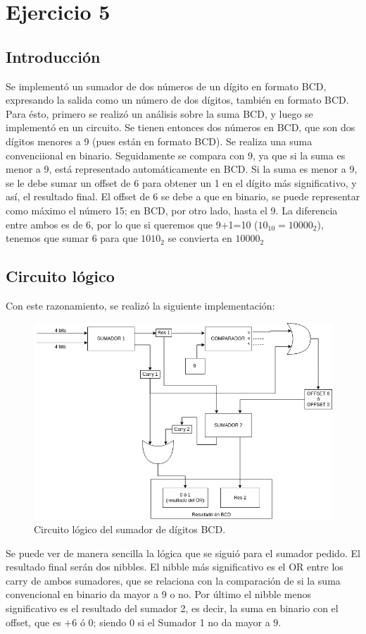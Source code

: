 \section{Ejercicio 5}
\subsection{Introducción}

Se implementó un sumador de dos números de un dígito en formato BCD, expresando la salida como un número de dos dígitos, también en formato BCD.
Para ésto, primero se realizó un análisis sobre la suma BCD, y luego se implementó en un circuito.
Se tienen entonces dos números en BCD, que son dos dígitos menores a 9 (pues están en formato BCD). Se realiza una suma convenciional en binario. Seguidamente se compara con 9, ya que si la suma es menor a 9, está representado automáticamente en BCD.
Si la suma es menor a 9, se le debe sumar un offset de 6 para obtener un 1 en el dígito más significativo, y así, el resultado final. 
El offset de 6 se debe a que en binario, se puede representar como máximo el número 15; en BCD, por otro lado, hasta el 9.
La diferencia entre ambos es de 6, por lo que si queremos que 9+1=10 ($10_{10}=1 0000_{2}$), tenemos que sumar 6
para que $1010_2$ se convierta en  $1 0000_{2}$
\subsection{Circuito lógico}
Con este razonamiento, se realizó la siguiente implementación:
\begin{figure}[H]
    \begin{center}
        \caption{Circuito lógico del sumador de dígitos BCD.}
\includegraphics[scale=0.5]{circuito.png}
    \end{center}
\end{figure}

Se puede ver de manera sencilla la lógica que se siguió para el sumador pedido. El resultado final serán dos nibbles. El nibble más significativo es el OR entre los carry de ambos sumadores, que se relaciona con la comparación de si la suma convencional 
en binario da mayor a 9 o no. Por último el nibble menos significativo es el resultado del sumador 2, es decir, la suma en binario con el offset, que es $+6$ ó $0$; siendo $0$ si el Sumador 1 no da mayor a $9$.